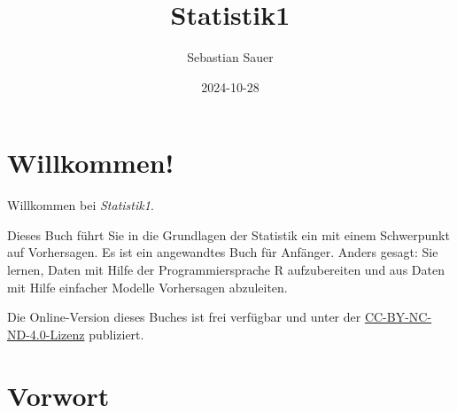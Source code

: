 \documentclass[
  letterpaper,
]{scrbook}
\title{Statistik1}
\author{Sebastian Sauer}
\date{2024-10-28}
\renewcommand*\contentsname{Inhaltsverzeichnis}
\newcommand\contentsname{Inhaltsverzeichnis}
\theoremstyle{definition}
\theoremstyle{definition}
\theoremstyle{definition}
\theoremstyle{remark}
\begin{document}
\frontmatter
\maketitle

\renewcommand*\contentsname{Inhaltsverzeichnis}
{
\setcounter{tocdepth}{2}
\tableofcontents
}

\mainmatter
{}

\chapter*{Willkommen!}\label{willkommen}


Willkommen bei \emph{Statistik1}.

Dieses Buch führt Sie in die Grundlagen der Statistik ein mit einem
Schwerpunkt auf Vorhersagen. Es ist ein angewandtes Buch für Anfänger.
Anders gesagt: Sie lernen, Daten mit Hilfe der Programmiersprache R
aufzubereiten und aus Daten mit Hilfe einfacher Modelle Vorhersagen
abzuleiten.

Die Online-Version dieses Buches ist frei verfügbar und unter der
\href{https://creativecommons.org/licenses/by-nc-nd/4.0/deed.de}{CC-BY-NC-ND-4.0-Lizenz}
publiziert.


\chapter*{Vorwort}\label{vorwort}

\end{document}
